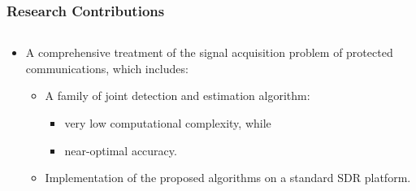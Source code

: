 \begin{frame}
    \frametitle{Research Contributions}

    \begin{columns}
      \begin{column}{0.54\textwidth}
        
        \begin{itemize}
          \item A comprehensive treatment of the signal acquisition problem of protected communications, which includes:      
          \begin{itemize}
              \item A family of joint detection and estimation algorithm:
              
              \begin{itemize}
                \item very low computational complexity, while
                \item near-optimal accuracy.
              \end{itemize}
              \item Implementation of the proposed algorithms on a standard SDR platform.
          \end{itemize} 
        \end{itemize}


\end{column}
\end{columns}
\end{frame}
